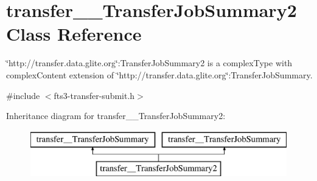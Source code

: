 \section{transfer\_\-\_\-TransferJobSummary2 Class Reference}
\label{classtransfer____TransferJobSummary2}


\char`\"{}http://transfer.data.glite.org\char`\"{}:TransferJobSummary2 is a complexType with complexContent extension of \char`\"{}http://transfer.data.glite.org\char`\"{}:TransferJobSummary.  




{\ttfamily \#include $<$fts3-\/transfer-\/submit.h$>$}

Inheritance diagram for transfer\_\-\_\-TransferJobSummary2:\begin{figure}[H]
\begin{center}
\leavevmode
\includegraphics[height=2.000000cm]{classtransfer____TransferJobSummary2}
\end{center}
\end{figure}

